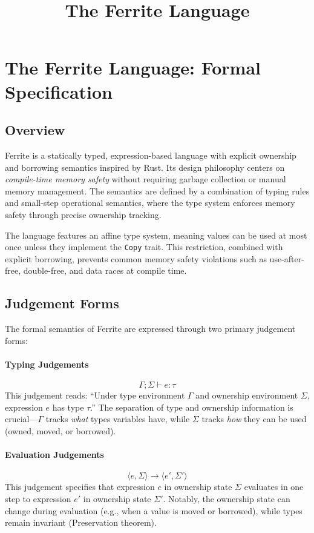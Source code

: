 \documentclass[11pt,a4paper,twoside]{book}
\title{The Ferrite Language}
\begin{document}
\maketitle


\tableofcontents
\bigskip


\section{The Ferrite Language: Formal Specification}

\subsection{Overview}

Ferrite is a statically typed, expression-based language with explicit ownership
and borrowing semantics inspired by Rust. Its design philosophy centers on
\emph{compile-time memory safety} without requiring garbage collection or manual
memory management. The semantics are defined by a combination of typing rules and
small-step operational semantics, where the type system enforces memory safety
through precise ownership tracking.

The language features an affine type system, meaning values can be used at most
once unless they implement the \texttt{Copy} trait. This restriction, combined
with explicit borrowing, prevents common memory safety violations such as
use-after-free, double-free, and data races at compile time.


\subsection{Judgement Forms}

The formal semantics of Ferrite are expressed through two primary judgement forms:

\paragraph{Typing Judgements}
\[
\Gamma ; \Sigma \vdash e : \tau
\]
This judgement reads: ``Under type environment $\Gamma$ and ownership environment
$\Sigma$, expression $e$ has type $\tau$.'' The separation of type and ownership
information is crucial---$\Gamma$ tracks \emph{what} types variables have, while
$\Sigma$ tracks \emph{how} they can be used (owned, moved, or borrowed).

\paragraph{Evaluation Judgements}
\[
\langle e, \Sigma \rangle \rightarrow \langle e', \Sigma' \rangle
\]
This judgement specifies that expression $e$ in ownership state $\Sigma$ evaluates
in one step to expression $e'$ in ownership state $\Sigma'$. Notably, the
ownership state can change during evaluation (e.g., when a value is moved or
borrowed), while types remain invariant (Preservation theorem).
\end{document}
